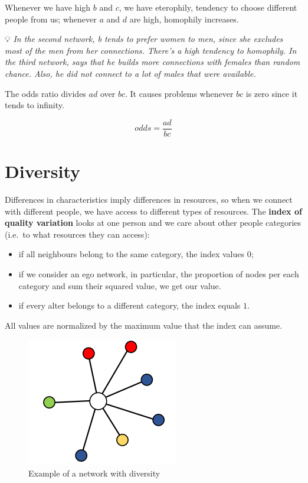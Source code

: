 \documentclass[
  notitlepage,
  onecolumn,
  openany]{book}
\providecommand{\tightlist}{%
  \setlength{\itemsep}{0pt}\setlength{\parskip}{0pt}}
\begin{document}
Whenever we have high \(b\) and \(c\), we have eterophily, tendency to choose different people from us; whenever \(a\) and \(d\) are high, homophily increases.

💡 \emph{In the second network, b tends to prefer women to men, since she excludes most of the men from her connections. There's a high tendency to homophily.
In the third network, says that he builds more connections with females than random chance. Also, he did not connect to a lot of males that were available.}

The odds ratio divides \(ad\) over \(bc\). It causes problems whenever \(bc\) is zero since it tends to infinity.

\[
odds = \frac{ad}{bc}
\]

\hypertarget{diversity}{%
\section{Diversity}\label{diversity}}

Differences in characteristics imply differences in resources, so when we connect with different people, we have access to different types of resources. The \textbf{index of quality variation} looks at one person and we care about other people categories (i.e.~to what resources they can access):

\begin{itemize}
\tightlist
\item
  if all neighbours belong to the same category, the index values \(0\);
\item
  if we consider an ego network, in particular, the proportion of nodes per each category and sum their squared value, we get our value.
\item
  if every alter belongs to a different category, the index equals \(1\).
\end{itemize}

All values are normalized by the maximum value that the index can assume.

\begin{figure}[h!]

{\centering \includegraphics[width=0.3\linewidth]{images/06-Attributes based measures/Untitled 5} 

}

\caption{Example of a network with diversity}\label{fig:unnamed-chunk-41}
\end{figure}
\end{document}
